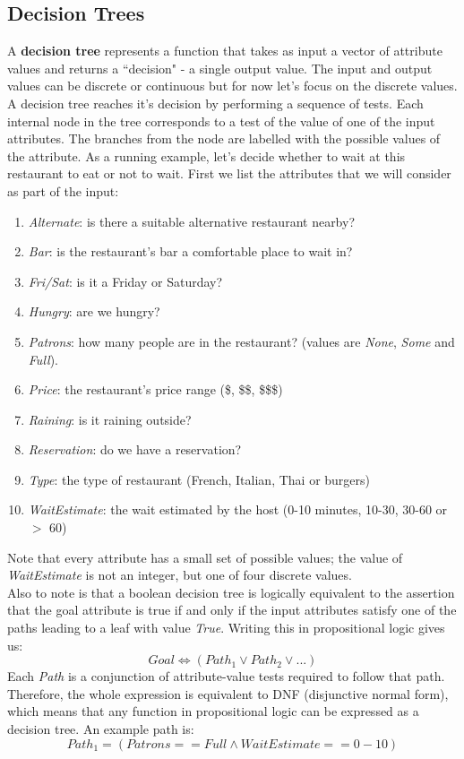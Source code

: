 \documentclass{article}
\newcommand{\n}[0]{\\[\baselineskip]}
\begin{document}
\subsection{Decision Trees}
A \textbf{decision tree} represents a function that takes as input a vector of attribute values and returns a ``decision" - a single output value. The input and output values can be discrete or continuous but for now let's focus on the discrete values. 
\n
A decision tree reaches it's decision by performing a sequence of tests. Each internal node in the tree corresponds to a test of the value of one of the input attributes. The branches from the node are labelled with the possible values of the attribute. As a running example, let's decide whether to wait at this restaurant to eat or not to wait. First we list the attributes that we will consider as part of the input:
\begin{enumerate}
\item \textit{Alternate}: is there a suitable alternative restaurant nearby?
\item \textit{Bar}: is the restaurant's bar a comfortable place to wait in?
\item \textit{Fri/Sat}: is it a Friday or Saturday?
\item \textit{Hungry}: are we hungry?
\item \textit{Patrons}: how many people are in the restaurant? (values are \textit{None}, \textit{Some} and \textit{Full}).
\item \textit{Price}: the restaurant's price range (\$, \$\$, \$\$\$)
\item \textit{Raining}: is it raining outside?
\item \textit{Reservation}: do we have a reservation?
\item \textit{Type}: the type of restaurant (French, Italian, Thai or burgers)
\item \textit{WaitEstimate}: the wait estimated by the host (0-10 minutes, 10-30, 30-60 or $>$ 60)
\end{enumerate}
Note that every attribute has a small set of possible values; the value of \textit{WaitEstimate} is not an integer, but one of four discrete values. 
\n
Also to note is that a boolean decision tree is logically equivalent to the assertion that the goal attribute is true if and only if the input attributes satisfy one of the paths leading to a leaf with value \textit{True}. Writing this in propositional logic gives us:
\begin{equation}
Goal \Leftrightarrow (Path_{1} \vee Path_{2} \vee ...)
\end{equation}
Each \textit{Path} is a conjunction of attribute-value tests required to follow that path. Therefore, the whole expression is equivalent to DNF (disjunctive normal form), which means that any function in propositional logic can be expressed as a decision tree. An example path is:
\begin{equation}
Path_{1} = (Patrons == Full \wedge WaitEstimate == 0-10)
\end{equation}
\end{document}
